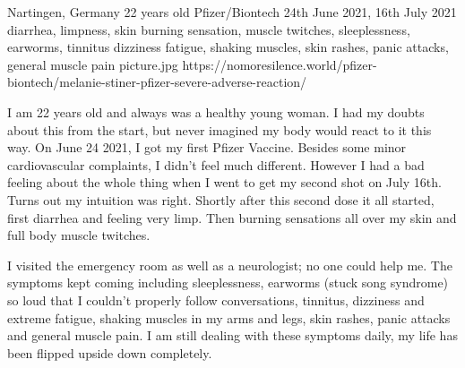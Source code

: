           {Nartingen, Germany}
          {22 years old}
          {Pfizer/Biontech}
          {24th June 2021, 16th July 2021}
          {diarrhea, limpness, skin burning sensation, muscle twitches, sleeplessness, earworms, tinnitus dizziness fatigue, shaking muscles, skin rashes, panic attacks, general muscle pain}
          {picture.jpg}
          {https://nomoresilence.world/pfizer-biontech/melanie-stiner-pfizer-severe-adverse-reaction/}
          {

I am 22 years old and always was a healthy young woman. I had my doubts about
this from the start, but never imagined my body would react to it this way. On
June 24 2021, I got my first Pfizer Vaccine. Besides some minor cardiovascular
complaints, I didn't feel much different. However I had a bad feeling about the
whole thing when I went to get my second shot on July 16th. Turns out my
intuition was right. Shortly after this second dose it all started, first
diarrhea and feeling very limp. Then burning sensations all over my skin and
full body muscle twitches.

I visited the emergency room as well as a neurologist; no one could help me. The
symptoms kept coming including sleeplessness, earworms (stuck song syndrome) so
loud that I couldn't properly follow conversations, tinnitus, dizziness and
extreme fatigue, shaking muscles in my arms and legs, skin rashes, panic attacks
and general muscle pain. I am still dealing with these symptoms daily,
my life has been flipped upside down completely.

}
